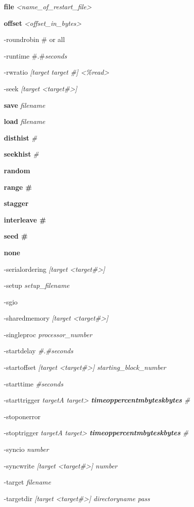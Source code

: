 \textbf{file} \emph{\textless name\_of\_restart\_file\textgreater{}}

\textbf{offset} \emph{\textless offset\_in\_bytes\textgreater{}}

-roundrobin \# or all

-runtime \#.\#\emph{seconds}

-rwratio \emph{{[}target target \#{]} \textless\%read\textgreater{}}

-seek \emph{{[}target \textless target\#\textgreater{]}}

\textbf{save} \emph{filename}

\textbf{load} \emph{filename}

\textbf{disthist} \emph{\#}

\textbf{seekhist} \emph{\#}

\textbf{random}

\textbf{range \#}

\textbf{stagger}

\textbf{interleave \#}

\textbf{seed \#}

\textbf{none}

-serialordering \emph{{[}target \textless target\#\textgreater{]}}

-setup \emph{setup\_filename}

-sgio

-sharedmemory \emph{{[}target \textless target\#\textgreater{]}}

-singleproc \emph{processor\_number}

-startdelay \emph{\#.\#seconds}

-startoffset \emph{{[}target \textless target\#\textgreater{]} starting\_block\_number}

-starttime \emph{\#seconds}

-starttrigger \emph{targetA target\textgreater{} \textbf{time\textbar op\textbar percent\textbar mbytes\textbar kbytes} \#}

-stoponerror

-stoptrigger \emph{targetA target\textgreater{} \textbf{time\textbar op\textbar percent\textbar mbytes\textbar kbytes} \#}

-syncio \emph{number}

-syncwrite \emph{{[}target \textless target\#\textgreater{]} number}

-target \emph{filename}

-targetdir \emph{{[}target \textless target\#\textgreater{]} directoryname pass}

